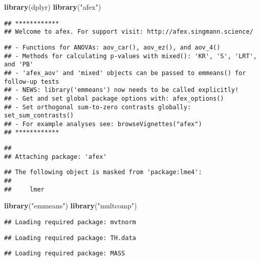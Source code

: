\documentclass[
]{article}
\newenvironment{Shaded}{\begin{snugshade}}{\end{snugshade}}
\newcommand{\KeywordTok}[1]{\textcolor[rgb]{0.13,0.29,0.53}{\textbf{#1}}}
\newcommand{\NormalTok}[1]{#1}
\newcommand{\StringTok}[1]{\textcolor[rgb]{0.31,0.60,0.02}{#1}}
\begin{document}
\begin{Shaded}
\begin{Highlighting}[]
\KeywordTok{library}\NormalTok{(dplyr)}
\KeywordTok{library}\NormalTok{(}\StringTok{"afex"}\NormalTok{)     }
\end{Highlighting}
\end{Shaded}

\begin{verbatim}
## ************
## Welcome to afex. For support visit: http://afex.singmann.science/
\end{verbatim}

\begin{verbatim}
## - Functions for ANOVAs: aov_car(), aov_ez(), and aov_4()
## - Methods for calculating p-values with mixed(): 'KR', 'S', 'LRT', and 'PB'
## - 'afex_aov' and 'mixed' objects can be passed to emmeans() for follow-up tests
## - NEWS: library('emmeans') now needs to be called explicitly!
## - Get and set global package options with: afex_options()
## - Set orthogonal sum-to-zero contrasts globally: set_sum_contrasts()
## - For example analyses see: browseVignettes("afex")
## ************
\end{verbatim}

\begin{verbatim}
## 
## Attaching package: 'afex'
\end{verbatim}

\begin{verbatim}
## The following object is masked from 'package:lme4':
## 
##     lmer
\end{verbatim}

\begin{Shaded}
\begin{Highlighting}[]
\KeywordTok{library}\NormalTok{(}\StringTok{"emmeans"}\NormalTok{)  }
\KeywordTok{library}\NormalTok{(}\StringTok{"multcomp"}\NormalTok{) }
\end{Highlighting}
\end{Shaded}

\begin{verbatim}
## Loading required package: mvtnorm
\end{verbatim}

\begin{verbatim}
## Loading required package: TH.data
\end{verbatim}

\begin{verbatim}
## Loading required package: MASS
\end{verbatim}
\end{document}
